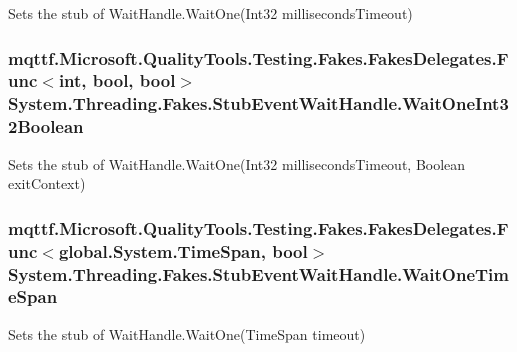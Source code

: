 Sets the stub of Wait\-Handle.\-Wait\-One(\-Int32 milliseconds\-Timeout)

\hypertarget{class_system_1_1_threading_1_1_fakes_1_1_stub_event_wait_handle_af1dc29e14bb6f4cf066a2bafee6a6b77}{
\subsubsection[{Wait\-One\-Int32\-Boolean}]{\setlength{\rightskip}{0pt plus 5cm}mqttf.\-Microsoft.\-Quality\-Tools.\-Testing.\-Fakes.\-Fakes\-Delegates.\-Func$<$int, bool, bool$>$ System.\-Threading.\-Fakes.\-Stub\-Event\-Wait\-Handle.\-Wait\-One\-Int32\-Boolean}}\label{class_system_1_1_threading_1_1_fakes_1_1_stub_event_wait_handle_af1dc29e14bb6f4cf066a2bafee6a6b77}


Sets the stub of Wait\-Handle.\-Wait\-One(\-Int32 milliseconds\-Timeout, Boolean exit\-Context)

\hypertarget{class_system_1_1_threading_1_1_fakes_1_1_stub_event_wait_handle_abba8ea18b569f9dc9a345bac982dc2b0}{
\subsubsection[{Wait\-One\-Time\-Span}]{\setlength{\rightskip}{0pt plus 5cm}mqttf.\-Microsoft.\-Quality\-Tools.\-Testing.\-Fakes.\-Fakes\-Delegates.\-Func$<$global.\-System.\-Time\-Span, bool$>$ System.\-Threading.\-Fakes.\-Stub\-Event\-Wait\-Handle.\-Wait\-One\-Time\-Span}}\label{class_system_1_1_threading_1_1_fakes_1_1_stub_event_wait_handle_abba8ea18b569f9dc9a345bac982dc2b0}


Sets the stub of Wait\-Handle.\-Wait\-One(\-Time\-Span timeout)

